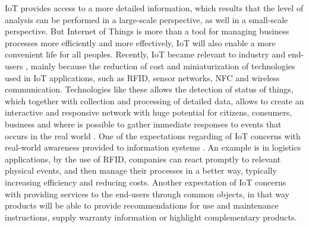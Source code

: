 IoT provides access to a more detailed information, which results that the level of analysis can be performed in a large-scale perspective, as well in a small-scale
perspective. But Internet of Things is more than a tool for managing business processes more efficiently and more effectively, IoT will also enable a more convenient life for all peoples.
Recently, IoT became relevant to industry and end-users \cite{Uckelmann:2011:AIT:2018904}, mainly because the reduction of cost and miniaturization of technologies used in IoT applications, such as RFID, sensor networks, NFC and
wireless communication. Technologies like these allows the detection of status of things, which together with collection and processing of detailed data,
allows to create an interactive and responsive network with huge potential for citizens, consumers, business and where is possible to gather immediate responses
to events that occurs in the real world \cite{Uckelmann:2011:AIT:2018904}. One of the expectations regarding of IoT concerns with real-world awareness provided to information systems \cite{mattern2010internet}.
An example is in logistics applications, by the use of RFID, companies can react promptly to relevant physical events, and then manage their processes in a better way,
typically increasing efficiency and reducing costs. Another expectation of IoT concerns with providing services to the end-users through common objects, in that
way products will be able to provide recommendations for use and maintenance instructions, supply warranty information or highlight complementary products.
